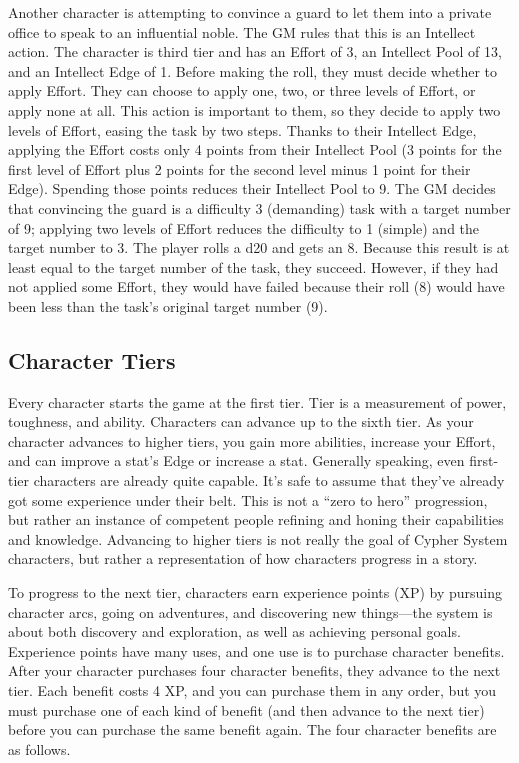 \begin{multicols}{2}
Another character is attempting to convince a guard to let them into a private office to speak to an influential noble. The GM rules that this is an Intellect action. The character is third tier and has an Effort of 3, an Intellect Pool of 13, and an Intellect Edge of 1. Before making the roll, they must decide whether to apply Effort. They can choose to apply one, two, or three levels of Effort, or apply none at all. This action is important to them, so they decide to apply two levels of Effort, easing the task by two steps. Thanks to their Intellect Edge, applying the Effort costs only 4 points from their Intellect Pool (3 points for the first level of Effort plus 2 points for the second level minus 1 point for their Edge). Spending those points reduces their Intellect Pool to 9. The GM decides that convincing the guard is a difficulty 3 (demanding) task with a target number of 9; applying two levels of Effort reduces the difficulty to 1 (simple) and the target number to 3. The player rolls a d20 and gets an 8. Because this result is at least equal to the target number of the task, they succeed. However, if they had not applied some Effort, they would have failed because their roll (8) would have been less than the task’s original target number (9).

\subsection{Character Tiers}

Every character starts the game at the first tier. Tier is a measurement of power, toughness, and ability. Characters can advance up to the sixth tier. As your character advances to higher tiers, you gain more abilities, increase your Effort, and can improve a stat’s Edge or increase a stat. Generally speaking, even first-tier characters are already quite capable. It’s safe to assume that they’ve already got some experience under their belt. This is not a “zero to hero” progression, but rather an instance of competent people refining and honing their capabilities and knowledge. Advancing to higher tiers is not really the goal of Cypher System characters, but rather a representation of how characters progress in a story.

To progress to the next tier, characters earn experience points (XP) by pursuing character arcs, going on adventures, and discovering new things—the system is about both discovery and exploration, as well as achieving personal goals. Experience points have many uses, and one use is to purchase character benefits. After your character purchases four character benefits, they advance to the next tier. Each benefit costs 4 XP, and you can purchase them in any order, but you must purchase one of each kind of benefit (and then advance to the next tier) before you can purchase the same benefit again. The four character benefits are as follows.


\end{multicols}
